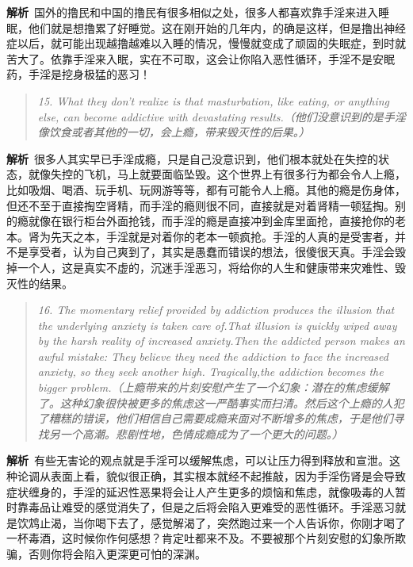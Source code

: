 \textbf{解析}\ 国外的撸民和中国的撸民有很多相似之处，很多人都喜欢靠手淫来进入睡眠，他们就是想撸累了好睡觉。这在刚开始的几年内，的确是这样，但是撸出神经症以后，就可能出现越撸越难以入睡的情况，慢慢就变成了顽固的失眠症，到时就苦大了。依靠手淫来入眠，实在不可取，这会让你陷入恶性循环，手淫不是安眠药，手淫是挖身极猛的恶习！

\begin{quote}\it
    15. What they don't realize is that masturbation, like eating, or anything else, can become addictive with devastating results.（他们没意识到的是手淫像饮食或者其他的一切，会上瘾，带来毁灭性的后果。）
\end{quote}

\textbf{解析}\ 很多人其实早已手淫成瘾，只是自己没意识到，他们根本就处在失控的状态，就像失控的飞机，马上就要面临坠毁。这个世界上有很多行为都会令人上瘾，比如吸烟、喝酒、玩手机、玩网游等等，都有可能令人上瘾。其他的瘾是伤身体，但还不至于直接掏空肾精，而手淫的瘾则很不同，直接就是对着肾精一顿猛掏。别的瘾就像在银行柜台外面抢钱，而手淫的瘾是直接冲到金库里面抢，直接抢你的老本。肾为先天之本，手淫就是对着你的老本一顿疯抢。手淫的人真的是受害者，并不是享受者，认为自己爽到了，其实是愚蠢而错误的想法，很傻很天真。手淫会毁掉一个人，这是真实不虚的，沉迷手淫恶习，将给你的人生和健康带来灾难性、毁灭性的结果。

\begin{quote}\it
    16. The momentary relief provided by addiction produces the illusion that the underlying anxiety is taken care of.That illusion is quickly wiped away by the harsh reality of increased anxiety.Then the addicted person makes an awful mistake: They believe they need the addiction to face the increased anxiety, so they seek another high. Tragically,the addiction becomes the bigger problem.（上瘾带来的片刻安慰产生了一个幻象：潜在的焦虑缓解了。这种幻象很快被更多的焦虑这一严酷事实而扫清。然后这个上瘾的人犯了糟糕的错误，他们相信自己需要成瘾来面对不断增多的焦虑，于是他们寻找另一个高潮。悲剧性地，色情成瘾成为了一个更大的问题。）
\end{quote}

\textbf{解析}\ 有些无害论的观点就是手淫可以缓解焦虑，可以让压力得到释放和宣泄。这种论调从表面上看，貌似很正确，其实根本就经不起推敲，因为手淫伤肾是会导致症状缠身的，手淫的延迟性恶果将会让人产生更多的烦恼和焦虑，就像吸毒的人暂时靠毒品让难受的感觉消失了，但是之后将会陷入更难受的恶性循环。手淫恶习就是饮鸩止渴，当你喝下去了，感觉解渴了，突然跑过来一个人告诉你，你刚才喝了一杯毒酒，这时候你作何感想？肯定吐都来不及。不要被那个片刻安慰的幻象所欺骗，否则你将会陷入更深更可怕的深渊。

